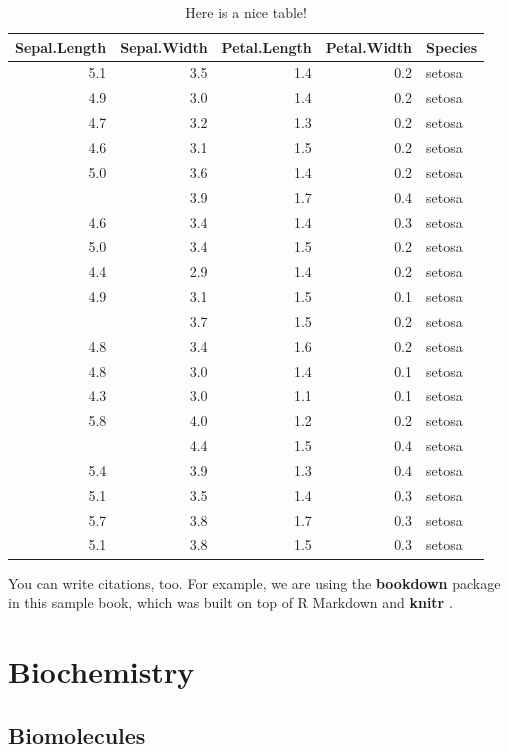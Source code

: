\documentclass[
]{book}
\begin{document}
\begin{table}

\caption{\label{tab:nice-tab}Here is a nice table!}
\centering
\begin{tabular}[t]{rrrrl}
\toprule
Sepal.Length & Sepal.Width & Petal.Length & Petal.Width & Species\\
\midrule
5.1 & 3.5 & 1.4 & 0.2 & setosa\\
4.9 & 3.0 & 1.4 & 0.2 & setosa\\
4.7 & 3.2 & 1.3 & 0.2 & setosa\\
4.6 & 3.1 & 1.5 & 0.2 & setosa\\
5.0 & 3.6 & 1.4 & 0.2 & setosa\\
\addlinespace
5.4 & 3.9 & 1.7 & 0.4 & setosa\\
4.6 & 3.4 & 1.4 & 0.3 & setosa\\
5.0 & 3.4 & 1.5 & 0.2 & setosa\\
4.4 & 2.9 & 1.4 & 0.2 & setosa\\
4.9 & 3.1 & 1.5 & 0.1 & setosa\\
\addlinespace
5.4 & 3.7 & 1.5 & 0.2 & setosa\\
4.8 & 3.4 & 1.6 & 0.2 & setosa\\
4.8 & 3.0 & 1.4 & 0.1 & setosa\\
4.3 & 3.0 & 1.1 & 0.1 & setosa\\
5.8 & 4.0 & 1.2 & 0.2 & setosa\\
\addlinespace
5.7 & 4.4 & 1.5 & 0.4 & setosa\\
5.4 & 3.9 & 1.3 & 0.4 & setosa\\
5.1 & 3.5 & 1.4 & 0.3 & setosa\\
5.7 & 3.8 & 1.7 & 0.3 & setosa\\
5.1 & 3.8 & 1.5 & 0.3 & setosa\\
\bottomrule
\end{tabular}
\end{table}

You can write citations, too. For example, we are using the \textbf{bookdown} package \citep{R-bookdown} in this sample book, which was built on top of R Markdown and \textbf{knitr} \citep{xie2015}.

\hypertarget{part-biochemistry}{%
\part{Biochemistry}\label{part-biochemistry}}

\hypertarget{biomolecules}{%
\chapter{Biomolecules}\label{biomolecules}}
\end{document}
